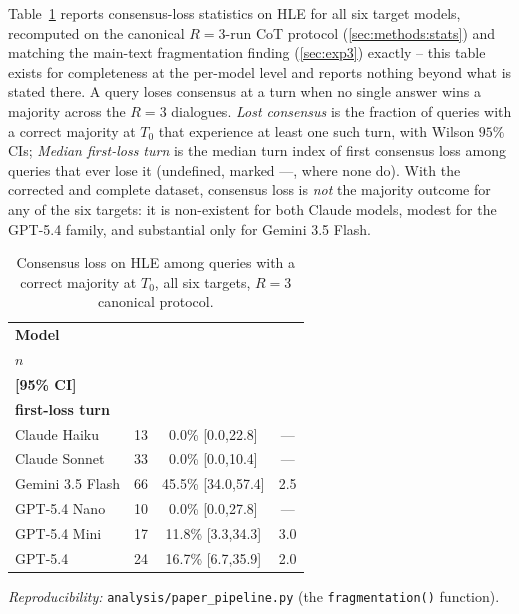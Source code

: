 Table~\ref{tab:hle_consensus} reports consensus-loss statistics on HLE for all six target models, recomputed on the canonical $R=3$-run CoT protocol (\autoref{sec:methods:stats}) and matching the main-text fragmentation finding (\autoref{sec:exp3}) exactly -- this table exists for completeness at the per-model level and reports nothing beyond what is stated there. A query loses consensus at a turn when no single answer wins a majority across the $R=3$ dialogues. \emph{Lost consensus} is the fraction of queries with a correct majority at $T_0$ that experience at least one such turn, with Wilson $95\%$ CIs; \emph{Median first-loss turn} is the median turn index of first consensus loss among queries that ever lose it (undefined, marked ---, where none do). With the corrected and complete dataset, consensus loss is \emph{not} the majority outcome for any of the six targets: it is non-existent for both Claude models, modest for the GPT-5.4 family, and substantial only for Gemini 3.5 Flash.

\begin{table}[t]
\centering
\small
\setlength{\tabcolsep}{3pt}
\renewcommand{\arraystretch}{1.10}
\caption{Consensus loss on HLE among queries with a correct majority at $T_0$, all six targets, $R=3$ canonical protocol.}
\label{tab:hle_consensus}
\begin{tabular}{lccc}
\toprule
\textbf{Model}
& \makecell{\textbf{Eligible}\\\textbf{$n$}}
& \makecell{\textbf{Lost consensus}\\\textbf{[95\% CI]}}
& \makecell{\textbf{Median}\\\textbf{first-loss turn}} \\
\midrule
Claude Haiku     &  13 &   0.0\% [0.0,22.8] & --- \\
Claude Sonnet    &  33 &   0.0\% [0.0,10.4] & --- \\
Gemini 3.5 Flash &  66 &  45.5\% [34.0,57.4] & 2.5 \\
GPT-5.4 Nano     &  10 &   0.0\% [0.0,27.8] & --- \\
GPT-5.4 Mini     &  17 &  11.8\% [3.3,34.3] & 3.0 \\
GPT-5.4          &  24 &  16.7\% [6.7,35.9] & 2.0 \\
\bottomrule
\end{tabular}
\vspace{2pt}
{\footnotesize\emph{Reproducibility:} \texttt{analysis/paper\_pipeline.py} (the \texttt{fragmentation()} function).}
\end{table}

